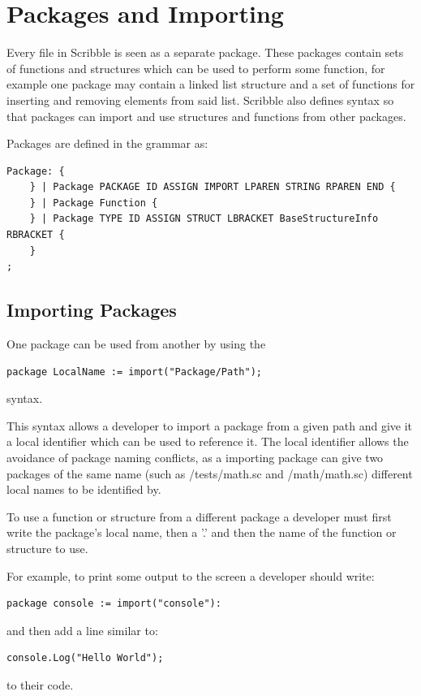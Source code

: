 \documentclass[]{final_report}
\begin{document}
\section{Packages and Importing}

Every file in Scribble is seen as a separate package. These packages contain sets of functions and structures which can be used to perform some function, for example one package may contain a linked list structure and a set of functions for inserting and removing elements from said list. Scribble also defines syntax so that packages can import and use structures and functions from other packages.

Packages are defined in the grammar as:
\begin{verbatim}
Package: {
	} | Package PACKAGE ID ASSIGN IMPORT LPAREN STRING RPAREN END {
	} | Package Function {
	} | Package TYPE ID ASSIGN STRUCT LBRACKET BaseStructureInfo RBRACKET {
	}
;
\end{verbatim}

\subsection{Importing Packages}

One package can be used from another by using the
\begin{verbatim}
package LocalName := import("Package/Path");
\end{verbatim}
syntax.

This syntax allows a developer to import a package from a given path and give it a local identifier which can be used to reference it. The local identifier allows the avoidance of package naming conflicts, as a importing package can give two packages of the same name (such as /tests/math.sc and /math/math.sc) different local names to be identified by.

To use a function or structure from a different package a developer must first write the package's local name, then a '.' and then the name of the function or structure to use.

For example, to print some output to the screen a developer should write:

\begin{verbatim}
package console := import("console"):
\end{verbatim}

and then add a line similar to:
\begin{verbatim}
console.Log("Hello World");
\end{verbatim}
to their code.
\end{document}
